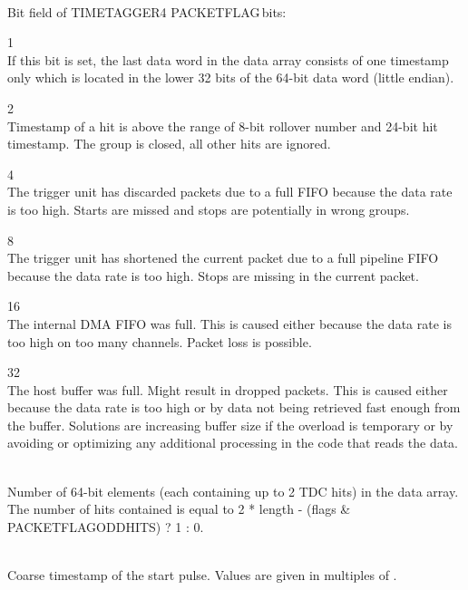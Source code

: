 	\\
    Bit field of \textsf{TIMETAGGER4 \tu PACKET\tu FLAG\tu*}\,bits: \par
	\indent{} 1\\
	  \indent If this bit is set, the last data word in the data array consists of one timestamp only which is located \indent in the lower 32 bits of the 64-bit data word (little endian).\par
	\indent{} 2\\
	  \indent Timestamp of a hit is above the range of 8-bit rollover number and 24-bit hit timestamp. The group \indent is closed, all other hits are ignored.\par
	\indent{} 4\\
	\indent The trigger unit has discarded packets due to a full FIFO because the data rate is too high. Starts are \indent missed and stops are potentially in wrong groups. \par
	\indent{} 8\\
	\indent The trigger unit has shortened the current packet due to a full pipeline FIFO because the data rate is \indent too high. Stops are missing in the current packet.\par
	\indent{} 16\\
	\indent The internal DMA FIFO was full. This is caused either because the data rate is too high on too many channels. Packet loss is possible.\par
	\indent{} 32\\
	\indent The host buffer was full. Might result in dropped packets. This is caused either because the data rate is too high or by data not being retrieved fast enough from the buffer. Solutions are increasing buffer size if the overload is temporary or by avoiding or optimizing any additional processing in the code that reads the data.\par

	\\
	Number of 64-bit elements (each containing up to 2 TDC hits) in the data array. The number of hits contained is equal to 2 * length - (flags \& PACKET\tu FLAG\tu ODD\tu HITS) ? 1 : 0.\par

	\\
	Coarse timestamp of the start pulse. Values are given in multiples of .\par

